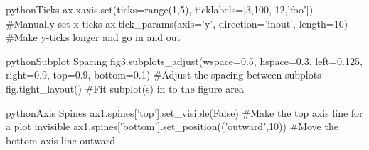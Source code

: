 \begin{codebox}{python}{Ticks}
ax.xaxis.set(ticks=range(1,5), ticklabels=[3,100,-12,'foo'])  #Manually set x-ticks
ax.tick_params(axis='y', direction='inout', length=10)  #Make y-ticks longer and go in and out
\end{codebox}

\begin{codebox}{python}{Subplot Spacing}
fig3.subplots_adjust(wspace=0.5, hspace=0.3, left=0.125, right=0.9, top=0.9,
 bottom=0.1)  #Adjust the spacing between subplots
fig.tight_layout()  #Fit subplot(s) in to the figure area
\end{codebox}

\begin{codebox}{python}{Axis Spines}
ax1.spines['top'].set_visible(False)  #Make the top axis line for a plot invisible
ax1.spines['bottom'].set_position(('outward',10))  #Move the bottom axis line outward
\end{codebox}